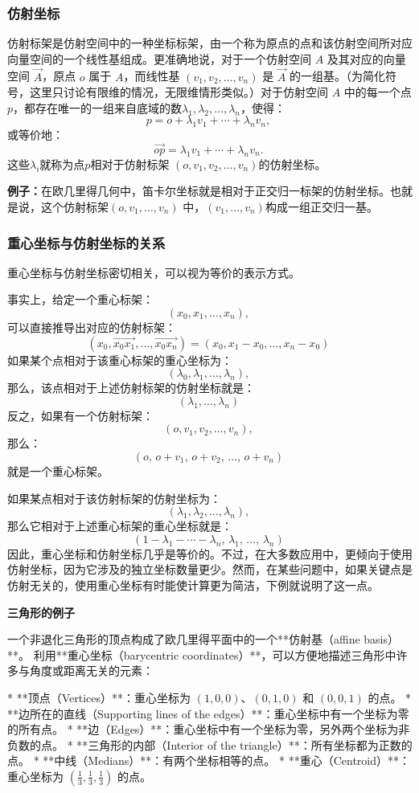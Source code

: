 \subsubsection{仿射坐标}
仿射标架是仿射空间中的一种坐标标架，由一个称为原点的点和该仿射空间所对应向量空间的一个线性基组成。更准确地说，对于一个仿射空间 $A$ 及其对应的向量空间 $\overrightarrow{A}$，原点 $o$ 属于 $A$，而线性基 $(v_1, v_2, \dots, v_n)$ 是 $\overrightarrow{A}$ 的一组基。（为简化符号，这里只讨论有限维的情况，无限维情形类似。）对于仿射空间 $A$ 中的每一个点 $p$，都存在唯一的一组来自底域的数$\lambda_1, \lambda_2, \dots, \lambda_n$，使得：
$$
p = o + \lambda_1 v_1 + \cdots + \lambda_n v_n,~
$$
或等价地：
$$
\overrightarrow{op} = \lambda_1 v_1 + \cdots + \lambda_n v_n.~
$$
这些$\lambda_i$就称为点$p$相对于仿射标架 $(o, v_1, v_2, \dots, v_n)$的仿射坐标。

\textbf{例子：}在欧几里得几何中，笛卡尔坐标就是相对于正交归一标架的仿射坐标。也就是说，这个仿射标架$(o, v_1, \dots, v_n)$ 中，$(v_1, \dots, v_n)$构成一组正交归一基。
\subsubsection{重心坐标与仿射坐标的关系}
重心坐标与仿射坐标密切相关，可以视为等价的表示方式。

事实上，给定一个重心标架：
$$
(x_0, x_1, \dots, x_n),~
$$
可以直接推导出对应的仿射标架：
$$
(x_0, \overrightarrow{x_0x_1}, \dots, \overrightarrow{x_0x_n})
= (x_0, x_1 - x_0, \dots, x_n - x_0)~
$$
如果某个点相对于该重心标架的重心坐标为：
$$
(\lambda_0, \lambda_1, \dots, \lambda_n),~
$$
那么，该点相对于上述仿射标架的仿射坐标就是：
$$
(\lambda_1, \dots, \lambda_n)~
$$
反之，如果有一个仿射标架：
$$
(o, v_1, v_2, \dots, v_n),~
$$
那么：
$$
(o,\, o+v_1,\, o+v_2,\, \dots,\, o+v_n)~
$$
就是一个重心标架。

如果某点相对于该仿射标架的仿射坐标为：
$$
(\lambda_1, \lambda_2, \dots, \lambda_n),~
$$
那么它相对于上述重心标架的重心坐标就是：
$$
(1 - \lambda_1 - \cdots - \lambda_n,\, \lambda_1,\, \dots,\, \lambda_n)~
$$
因此，重心坐标和仿射坐标几乎是等价的。不过，在大多数应用中，更倾向于使用仿射坐标，因为它涉及的独立坐标数量更少。然而，在某些问题中，如果关键点是仿射无关的，使用重心坐标有时能使计算更为简洁，下例就说明了这一点。

\textbf{三角形的例子}

一个非退化三角形的顶点构成了欧几里得平面中的一个**仿射基（affine basis）**。
利用**重心坐标（barycentric coordinates）**，可以方便地描述三角形中许多与角度或距离无关的元素：

* **顶点（Vertices）**：重心坐标为 $(1, 0, 0)$、$(0, 1, 0)$ 和 $(0, 0, 1)$ 的点。
* **边所在的直线（Supporting lines of the edges）**：重心坐标中有一个坐标为零的所有点。
* **边（Edges）**：重心坐标中有一个坐标为零，另外两个坐标为非负数的点。
* **三角形的内部（Interior of the triangle）**：所有坐标都为正数的点。
* **中线（Medians）**：有两个坐标相等的点。
* **重心（Centroid）**：重心坐标为 $\left(\tfrac{1}{3}, \tfrac{1}{3}, \tfrac{1}{3}\right)$ 的点。

